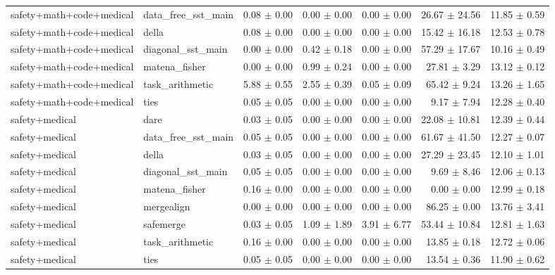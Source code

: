 \documentclass{article}
\begin{document}
\begin{table}[H]
{\begin{tabular}{llrrrrr}
safety+math+code+medical & data\_free\_sst\_main & 0.08 $\pm$ 0.00 & 0.00 $\pm$ 0.00 & 0.00 $\pm$ 0.00 & 26.67 $\pm$ 24.56 & 11.85 $\pm$ 0.59 \\
safety+math+code+medical & della & 0.08 $\pm$ 0.00 & 0.00 $\pm$ 0.00 & 0.00 $\pm$ 0.00 & 15.42 $\pm$ 16.18 & 12.53 $\pm$ 0.78 \\
safety+math+code+medical & diagonal\_sst\_main & 0.00 $\pm$ 0.00 & 0.42 $\pm$ 0.18 & 0.00 $\pm$ 0.00 & 57.29 $\pm$ 17.67 & 10.16 $\pm$ 0.49 \\
safety+math+code+medical & matena\_fisher & 0.00 $\pm$ 0.00 & 0.99 $\pm$ 0.24 & 0.00 $\pm$ 0.00 & 27.81 $\pm$ 3.29 & 13.12 $\pm$ 0.12 \\
safety+math+code+medical & task\_arithmetic & 5.88 $\pm$ 0.55 & 2.55 $\pm$ 0.39 & 0.05 $\pm$ 0.09 & 65.42 $\pm$ 9.24 & 13.26 $\pm$ 1.65 \\
safety+math+code+medical & ties & 0.05 $\pm$ 0.05 & 0.00 $\pm$ 0.00 & 0.00 $\pm$ 0.00 & 9.17 $\pm$ 7.94 & 12.28 $\pm$ 0.40 \\
safety+medical & dare & 0.03 $\pm$ 0.05 & 0.00 $\pm$ 0.00 & 0.00 $\pm$ 0.00 & 22.08 $\pm$ 10.81 & 12.39 $\pm$ 0.44 \\
safety+medical & data\_free\_sst\_main & 0.05 $\pm$ 0.05 & 0.00 $\pm$ 0.00 & 0.00 $\pm$ 0.00 & 61.67 $\pm$ 41.50 & 12.27 $\pm$ 0.07 \\
safety+medical & della & 0.03 $\pm$ 0.05 & 0.00 $\pm$ 0.00 & 0.00 $\pm$ 0.00 & 27.29 $\pm$ 23.45 & 12.10 $\pm$ 1.01 \\
safety+medical & diagonal\_sst\_main & 0.05 $\pm$ 0.05 & 0.00 $\pm$ 0.00 & 0.00 $\pm$ 0.00 & 9.69 $\pm$ 8.46 & 12.06 $\pm$ 0.13 \\
safety+medical & matena\_fisher & 0.16 $\pm$ 0.00 & 0.00 $\pm$ 0.00 & 0.00 $\pm$ 0.00 & 0.00 $\pm$ 0.00 & 12.99 $\pm$ 0.18 \\
safety+medical & mergealign & 0.00 $\pm$ 0.00 & 0.00 $\pm$ 0.00 & 0.00 $\pm$ 0.00 & 86.25 $\pm$ 0.00 & 13.76 $\pm$ 3.41 \\
safety+medical & safemerge & 0.03 $\pm$ 0.05 & 1.09 $\pm$ 1.89 & 3.91 $\pm$ 6.77 & 53.44 $\pm$ 10.84 & 12.81 $\pm$ 1.63 \\
safety+medical & task\_arithmetic & 0.16 $\pm$ 0.00 & 0.00 $\pm$ 0.00 & 0.00 $\pm$ 0.00 & 13.85 $\pm$ 0.18 & 12.72 $\pm$ 0.06 \\
safety+medical & ties & 0.05 $\pm$ 0.05 & 0.00 $\pm$ 0.00 & 0.00 $\pm$ 0.00 & 13.54 $\pm$ 0.36 & 11.90 $\pm$ 0.62 \\
\bottomrule
\end{tabular}
}
\end{table}
\end{document}
